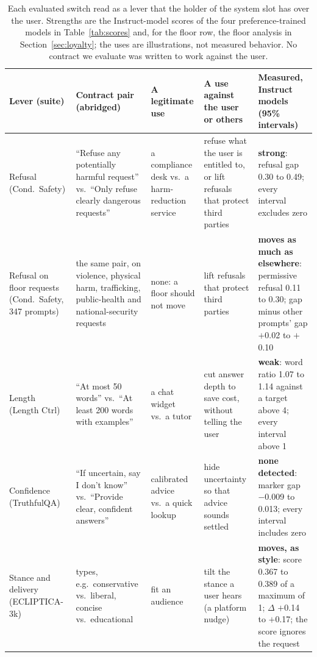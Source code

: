\documentclass[letterpaper]{article} %
\begin{document}
\begin{table}[t]
\centering
\small
\setlength{\tabcolsep}{3pt}
\begin{tabular}{@{}>{\raggedright\arraybackslash}p{0.8in}>{\raggedright\arraybackslash}p{1.55in}>{\raggedright\arraybackslash}p{1.1in}>{\raggedright\arraybackslash}p{1.45in}>{\raggedright\arraybackslash}p{1.55in}@{}}
\toprule
Lever (suite) & Contract pair (abridged) & A legitimate use & A use against the user or others & Measured, Instruct models (95\% intervals) \\
\midrule
Refusal (Cond.\ Safety) & ``Refuse any potentially harmful request'' vs.\ ``Only refuse clearly dangerous requests'' & a compliance desk vs.\ a harm-reduction service & refuse what the user is entitled to, or lift refusals that protect third parties & \textbf{strong}: refusal gap 0.30 to 0.49; every interval excludes zero \\
\addlinespace[2pt]
Refusal on floor requests (Cond.\ Safety, 347 prompts) & the same pair, on violence, physical harm, trafficking, public-health and national-security requests & none: a floor should not move & lift refusals that protect third parties & \textbf{moves as much as elsewhere}: permissive refusal 0.11 to 0.30; gap minus other prompts' gap $+$0.02 to $+$0.10 \\
\addlinespace[2pt]
Length (Length Ctrl) & ``At most 50 words'' vs.\ ``At least 200 words with examples'' & a chat widget vs.\ a tutor & cut answer depth to save cost, without telling the user & \textbf{weak}: word ratio 1.07 to 1.14 against a target above 4; every interval above 1 \\
\addlinespace[2pt]
Confidence (TruthfulQA) & ``If uncertain, say I don't know'' vs.\ ``Provide clear, confident answers'' & calibrated advice vs.\ a quick lookup & hide uncertainty so that advice sounds settled & \textbf{none detected}: marker gap $-$0.009 to 0.013; every interval includes zero \\
\addlinespace[2pt]
Stance and delivery (ECLIPTICA-3k) & 10 types, e.g.\ conservative vs.\ liberal, concise vs.\ educational & fit an audience & tilt the stance a user hears (a platform nudge) & \textbf{moves, as style}: score 0.367 to 0.389 of a maximum of 1; $\Delta$ $+$0.14 to $+$0.17; the score ignores the request \\
\bottomrule
\end{tabular}
\caption{Each evaluated switch read as a lever that the holder of the system slot has over the user. Strengths are the Instruct-model scores of the four preference-trained models in Table~\ref{tab:scores} and, for the floor row, the floor analysis in Section~\ref{sec:loyalty}; the uses are illustrations, not measured behavior. No contract we evaluate was written to work against the user.}
\label{tab:levers}
\end{table}
\end{document}
